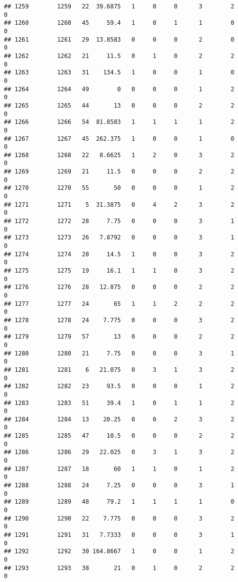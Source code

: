 \documentclass[
]{article}
\begin{document}
\begin{verbatim}
## 1259        1259   22  39.6875   1     0     0      3        2         0
## 1260        1260   45     59.4   1     0     1      1        0         0
## 1261        1261   29  13.8583   0     0     0      2        0         0
## 1262        1262   21     11.5   0     1     0      2        2         0
## 1263        1263   31    134.5   1     0     0      1        0         0
## 1264        1264   49        0   0     0     0      1        2         0
## 1265        1265   44       13   0     0     0      2        2         0
## 1266        1266   54  81.8583   1     1     1      1        2         0
## 1267        1267   45  262.375   1     0     0      1        0         0
## 1268        1268   22   8.6625   1     2     0      3        2         0
## 1269        1269   21     11.5   0     0     0      2        2         0
## 1270        1270   55       50   0     0     0      1        2         0
## 1271        1271    5  31.3875   0     4     2      3        2         0
## 1272        1272   28     7.75   0     0     0      3        1         0
## 1273        1273   26   7.8792   0     0     0      3        1         0
## 1274        1274   28     14.5   1     0     0      3        2         0
## 1275        1275   19     16.1   1     1     0      3        2         0
## 1276        1276   28   12.875   0     0     0      2        2         0
## 1277        1277   24       65   1     1     2      2        2         0
## 1278        1278   24    7.775   0     0     0      3        2         0
## 1279        1279   57       13   0     0     0      2        2         0
## 1280        1280   21     7.75   0     0     0      3        1         0
## 1281        1281    6   21.075   0     3     1      3        2         0
## 1282        1282   23     93.5   0     0     0      1        2         0
## 1283        1283   51     39.4   1     0     1      1        2         0
## 1284        1284   13    20.25   0     0     2      3        2         0
## 1285        1285   47     10.5   0     0     0      2        2         0
## 1286        1286   29   22.025   0     3     1      3        2         0
## 1287        1287   18       60   1     1     0      1        2         0
## 1288        1288   24     7.25   0     0     0      3        1         0
## 1289        1289   48     79.2   1     1     1      1        0         0
## 1290        1290   22    7.775   0     0     0      3        2         0
## 1291        1291   31   7.7333   0     0     0      3        1         0
## 1292        1292   30 164.8667   1     0     0      1        2         0
## 1293        1293   38       21   0     1     0      2        2         0

\end{verbatim}
\end{document}
